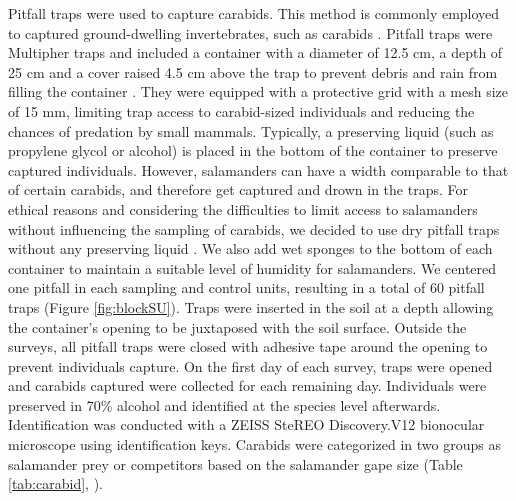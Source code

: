 Pitfall traps were used to capture carabids.
This method is commonly employed to captured ground-dwelling invertebrates, such as carabids \citep{baarsCatchesPitfallTraps1979,knappEffectPitfallTrap2012,kotzeFortyYearsCarabid2011a,loveiEcologyBehaviorGround1996,spenceSamplingCarabidAssemblages1994a}. 
Pitfall traps were Multipher\up{\textregistered{}} traps and included a container with a diameter of 12.5 cm, a depth of 25 cm and a cover raised 4.5 cm above the trap 
to prevent debris and rain from filling the container \citep{bouchardBeetleCommunityResponse2016b,mooreEffectsTwoSilvicultural2004}.
They were equipped with a protective grid with a mesh size of 15 mm, limiting trap access to carabid-sized individuals and reducing the chances of predation by small mammals. 
Typically, a preserving liquid (such as propylene glycol or alcohol) is placed in the bottom of the container to preserve captured individuals. 
However, salamanders can have a width comparable to that of certain carabids, and therefore get captured and drown in the traps. 
For ethical reasons and considering the difficulties to limit access to salamanders without influencing the sampling of carabids, we decided to use dry pitfall traps without any preserving liquid \citep{luffFeaturesInfluencingEfficiency1975}. 
We also add wet sponges to the bottom of each container to maintain a suitable level of humidity for salamanders.
We centered one pitfall in each sampling and control units, resulting in a total of 60 pitfall traps (Figure \ref{fig:blockSU}). 
Traps were inserted in the soil at a depth allowing the container's opening to be juxtaposed with the soil surface. 
Outside the surveys, all pitfall traps were closed with adhesive tape around the opening to prevent individuals capture. 
On the first day of each survey, traps were opened and carabids captured were collected for each remaining day. 
Individuals were preserved in 70\% alcohol and identified at the species level afterwards.
Identification was conducted with a ZEISS SteREO Discovery.V12 bionocular microscope using \cite{larochelleManuelIdentificationCarabidae1976} identification keys.
Carabids were categorized in two groups as salamander prey or competitors based on the salamander gape size (Table \ref{tab:carabid}, \citealp{jaegerFoodLimitedResource1972,magliaModulationPreycaptureBehavior1995,magliaOntogenyFeedingEcology1996}).

